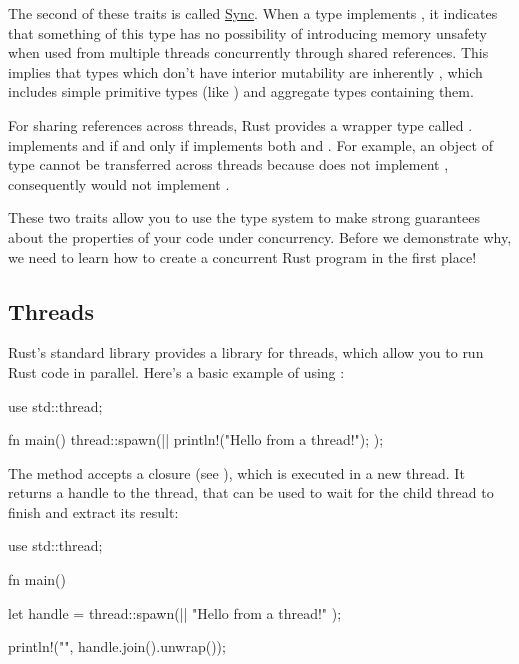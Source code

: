 
The second of these traits is called \href{https://doc.rust-lang.org/std/marker/trait.Sync.html}{Sync}. When a type  
implements , it indicates that something of this type has no possibility of introducing memory unsafety when used from 
multiple threads concurrently through shared references. This implies that types which don't have interior mutability are inherently 
, which includes simple primitive types (like ) and aggregate types containing them.

\blank

For sharing references across threads, Rust provides a wrapper type called .  implements  and 
 if and only if  implements both  and . For example, an object of type  
cannot be transferred across threads because  does not implement , consequently  would 
not implement .

\blank

These two traits allow you to use the type system to make strong guarantees about the properties of your code under concurrency. 
Before we demonstrate why, we need to learn how to create a concurrent Rust program in the first place!

\subsection*{Threads}

Rust's standard library provides a library for threads, which allow you to run Rust code in parallel. Here's a basic example of using 
:

\begin{rustc}
use std::thread;

fn main() {
    thread::spawn(|| {
        println!("Hello from a thread!");
    });
}
\end{rustc}

The  method accepts a closure (see ), which is executed in a new thread. It returns 
a handle to the thread, that can be used to wait for the child thread to finish and extract its result:

\begin{rustc}
use std::thread;

fn main() {
    let handle = thread::spawn(|| {
        "Hello from a thread!"
    });

    println!("{}", handle.join().unwrap());
}
\end{rustc}

